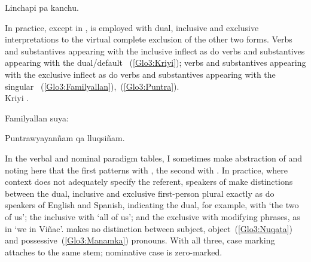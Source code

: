 %
{Linchapi pa kanchu.}%
{}%
{}{}%

\noindent
In practice, except in \CH,  is employed with dual, inclusive and exclusive interpretations to the virtual complete exclusion of the other two forms. Verbs and substantives appearing with the inclusive  inflect as do verbs and substantives appearing with the dual/default ~(\ref{Glo3:Kriyi}); verbs and substantives appearing with the exclusive  inflect as do verbs and substantives appearing with the singular ~(\ref{Glo3:Familyallan}),~(\ref{Glo3:Puntra}).\\

%
{Kriyi .}%
{}%
{}{}%

%
{Familyallan  suya:}%
{}%
{}{}%

%
{Puntrawyayanñam qa lluqsiñam.}%
{}%
{}{}%

\noindent
In the verbal and nominal paradigm tables, I sometimes make abstraction of  and  noting here that the first patterns with , the second with . In practice, where context does not adequately specify the referent, speakers of \SYQ{} make distinctions between the dual, inclusive and exclusive first-person plural exactly as do speakers of English and Spanish, indicating the dual, for example, with  ‘the two of us’; the inclusive with  ‘all of us’; and the exclusive with modifying phrases, as in  ‘we in Viñac’. \SYQ{} makes no distinction between subject, object~(\ref{Glo3:Nuqata}) and possessive~(\ref{Glo3:Manamka}) pronouns. With all three, case marking attaches to the same stem; nominative case is zero-marked.\\

